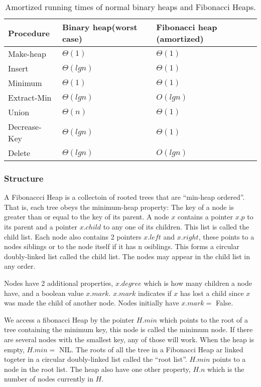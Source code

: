 \begin{table}[h]
\begin{tabular}{lll}
  Procedure    & Binary heap(worst case) & Fibonacci heap (amortized) \\ \hline
  Make-heap    & $\Theta(1)$             & $\Theta(1)$ \\
  Insert       & $\Theta(lg n)$          & $\Theta(1)$ \\
  Minimum      & $\Theta(1)$             & $\Theta(1)$ \\
  Extract-Min  & $\Theta(lg n)$          & $O(lg n)$ \\
  Union        & $\Theta(n)$             & $\Theta(1)$ \\
  Decrease-Key & $\Theta(lg n)$          & $\Theta(1)$ \\
  Delete       & $\Theta(lg n)$          & $O(lg n)$
\end{tabular}
\caption{Amortized running times of normal binary heaps and Fibonacci Heaps.}
\end{table}

\subsubsection{Structure}

A Fibonaccci Heap is a collectoin of rooted trees that are ``min-heap
ordered''. That is, each tree obeys the minimum-heap property: The key of a node
is greater than or equal to the key of its parent. A node $x$ contains a pointer
$x.p$ to its parent and a pointer $x.child$ to any one of its children. This
list is called the child list. Each node also contains 2 pointers $x.left$ and
$x.right$, these points to a nodes siblings or to the node itself if it has n
osiblings. This forms a circular doubly-linked list called the child list. The
nodes may appear in the child list in any order.

Nodes have 2 additional properties, $x.degree$ which is how many children a node
have, and a boolean value $x.mark$. $x.mark$ indicates if $x$ has lost a child
since $x$ was made the child of another node. Nodes initially have $x.mark =$
False.


We access a fibonacci Heap by the pointer $H.min$ which points to the root of a
tree containing the minimum key, this node is called the minimum node. If there
are several nodes with the smallest key, any of those will work. When the heap
is empty, $H.min =$ NIL. The roots of all the tree in a Fibonacci Heap ar linked
togeter in a circular doubly-linked list called the ``root list''. $H.min$
points to a node in the root list. The heap also have one other property, $H.n$
which is the number of nodes currently in $H$.

